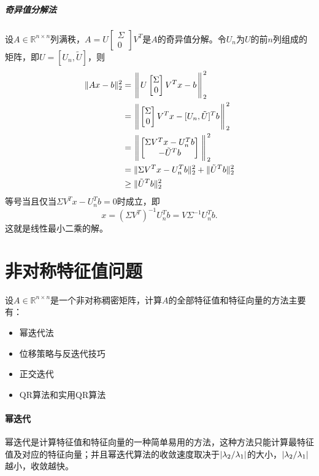 \documentclass[UTF8]{article}
\begin{document}
\begin{flushleft}
\subparagraph{奇异值分解法}
设$A\in\mathbb{R}^{n \times n}$列满秩，$A=U\begin{bmatrix}\Sigma \\ 0 \end{bmatrix}V^T$是$A$的奇异值分解。令$U_n$为$U$的前$n$列组成的矩阵，即$U=[U_n , \tilde{U}]$，则
\begin{displaymath}
\begin{aligned}
\Arrowvert Ax-b \Arrowvert_2^2 &= \Biggl\Arrowvert U\begin{bmatrix}\Sigma \\ 0 \end{bmatrix}V^Tx-b \Biggl\Arrowvert_2^2 \\
&= \Biggl\Arrowvert \begin{bmatrix}\Sigma \\ 0 \end{bmatrix}V^Tx-[U_n , \tilde{U}]^Tb \Biggl\Arrowvert_2^2 \\
&= \Biggl\Arrowvert \begin{bmatrix}\Sigma V^Tx-U_n^Tb \\ -\tilde{U}^Tb \end{bmatrix} \Biggl\Arrowvert_2^2 \\
&= \Arrowvert \Sigma V^Tx-U_n^Tb \Arrowvert_2^2 + \Arrowvert \tilde{U}^Tb \Arrowvert_2^2 \\
& \geq \Arrowvert \tilde{U}^Tb \Arrowvert_2^2
\end{aligned}
\end{displaymath}
等号当且仅当$\Sigma V^Tx-U_n^Tb=0$时成立，即
$$x=(\Sigma V^T)^{-1}U_n^Tb=V \Sigma ^{-1}U_n^Tb.$$
这就是线性最小二乘的解。

\section{非对称特征值问题}
设$A\in\mathbb{R}^{n \times n}$是一个非对称稠密矩阵，计算$A$的全部特征值和特征向量的方法主要有：
\begin{itemize}
  \item 幂迭代法
  \item 位移策略与反迭代技巧
  \item 正交迭代
  \item QR算法和实用QR算法
\end{itemize}
\paragraph{幂迭代}
幂迭代是计算特征值和特征向量的一种简单易用的方法，这种方法只能计算最特征值及对应的特征向量；并且幂迭代算法的收敛速度取决于$\arrowvert \lambda_2/\lambda_1 \arrowvert$的大小，$\arrowvert \lambda_2/\lambda_1 \arrowvert$ 越小，收敛越快。


\end{flushleft}
\end{document}

